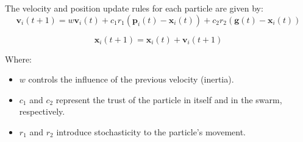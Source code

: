 \documentclass[paper,revised]{geophysics}
\begin{document}
The velocity and position update rules for each particle are given by:
\begin{equation}	
	\mathbf{v}_i(t+1) = w \mathbf{v}_i(t) + c_1 r_1 (\mathbf{p}_i(t) - \mathbf{x}_i(t)) + c_2 r_2 (\mathbf{g}(t) - \mathbf{x}_i(t))	
	\label{eqn:pso_1}
\end{equation}

\begin{equation}	
	\mathbf{x}_i(t+1) = \mathbf{x}_i(t) + \mathbf{v}_i(t+1)	
	\label{eqn:pso_2}
\end{equation}

Where:
\begin{itemize}
	\item \( w \) controls the influence of the previous velocity (inertia).
	\item \( c_1 \) and \( c_2 \) represent the trust of the particle in itself and in the swarm, respectively.
	\item \( r_1 \) and \( r_2 \) introduce stochasticity to the particle's movement.
\end{itemize}
\end{document}
